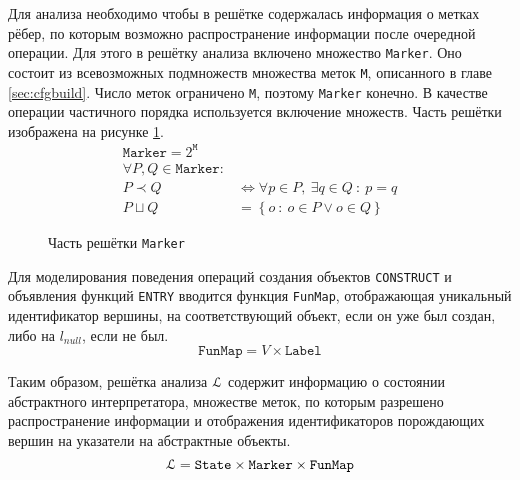 Для анализа необходимо чтобы в решётке содержалась информация о метках
рёбер, по которым возможно распространение информации после очередной
операции. Для этого в решётку анализа включено множество
\texttt{Marker}. Оно  состоит из всевозможных подмножеств множества
меток \texttt{M}, описанного в главе \ref{sec:cfgbuild}. Число меток
ограничено \texttt{M}, поэтому \texttt{Marker} конечно. В качестве
операции частичного порядка используется включение множеств. Часть
решётки изображена на рисунке \ref{fig:marker}.
\begin{align*}
  \mathtt{Marker} = 2^\mathtt{M} \\
  \forall  P,Q \in \mathtt{Marker}: & \\
  P \prec Q &\Leftrightarrow \forall p \in P,\ \exists q \in Q\ :\ p = q \\
  P \sqcup Q &= \left\{ o\ :\ o \in P  \lor o \in Q \right\}
\end{align*}%
\begin{figure}[htp]
\centering
{}
\caption{Часть решётки \texttt{Marker}}
\label{fig:marker}
\end{figure}%

Для моделирования поведения операций создания объектов
\texttt{CONSTRUCT} и объявления функций \texttt{ENTRY} вводится
функция \texttt{FunMap}, отображающая уникальный идентификатор
вершины, на соответствующий объект, если он уже был создан, либо на
$l_{null}$, если не был.
\[
\mathtt{FunMap} = V \times \mathtt{Label}
\]

Таким образом, решётка анализа $\EuScript{L}$ содержит информацию о
состоянии абстрактного интерпретатора, множестве меток, по которым
разрешено распространение информации и отображения идентификаторов
порождающих вершин на указатели на абстрактные объекты.
\[ \EuScript{L} = \mathtt{State} \times \texttt{Marker} \times
\texttt{FunMap} \]
